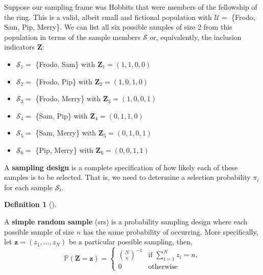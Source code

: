 \documentclass[
  letterpaper,
  DIV=11,
  numbers=noendperiod]{scrreprt}
\providecommand{\tightlist}{%
  \setlength{\itemsep}{0pt}\setlength{\parskip}{0pt}}\usepackage{longtable,booktabs,array}
\newcommand{\mb}{\symbf}
\renewcommand{\P}{\mathbb{P}}
\theoremstyle{definition}
\newtheorem{definition}{Definition}[chapter]
\theoremstyle{plain}
\theoremstyle{definition}
\theoremstyle{remark}
\begin{document}
Suppose our sampling frame was Hobbits that were members of the
fellowship of the ring. This is a valid, albeit small and fictional
population with \(\mathcal{U} =\) \{Frodo, Sam, Pip, Merry\}. We can
list all six possible samples of size 2 from this population in terms of
the sample members \(\mathcal{S}\) or, equivalently, the inclusion
indicators \(\mb{Z}\):

\begin{itemize}
\tightlist
\item
  \(\mathcal{S}_1 =\) \{Frodo, Sam\} with \(\mb{Z}_{1} = (1, 1, 0, 0)\)
\item
  \(\mathcal{S}_2 =\) \{Frodo, Pip\} with \(\mb{Z}_{2} = (1, 0, 1, 0)\)
\item
  \(\mathcal{S}_3 =\) \{Frodo, Merry\} with
  \(\mb{Z}_{3} = (1, 0, 0, 1)\)
\item
  \(\mathcal{S}_4 =\) \{Sam, Pip\} with \(\mb{Z}_{4} = (0, 1, 1, 0)\)
\item
  \(\mathcal{S}_5 =\) \{Sam, Merry\} with \(\mb{Z}_{5} = (0, 1, 0, 1)\)
\item
  \(\mathcal{S}_6 =\) \{Pip, Merry\} with \(\mb{Z}_{6} = (0, 0, 1, 1)\)
\end{itemize}

A \textbf{sampling design} is a complete specification of how likely
each of these samples is to be selected. That is, we need to determine a
selection probability \(\pi_i\) for each sample \(\mathcal{S}_i\).

\begin{definition}[]\protect\hypertarget{def-srs}{}\label{def-srs}

A \textbf{simple random sample} (srs) is a probability sampling design
where each possible sample of size \(n\) has the same probability of
occurring. More specifically, let \(\mb{z} = (z_{1}, \ldots, z_{N})\) be
a particular possible sampling, then, \[
\P(\mb{Z} = \mb{z}) = \begin{cases}
{N \choose n}^{-1} &\text{if } \sum_{i=1}^N z_i = n,\\
0 & \text{otherwise}
\end{cases}
\]

\end{definition}
\end{document}

